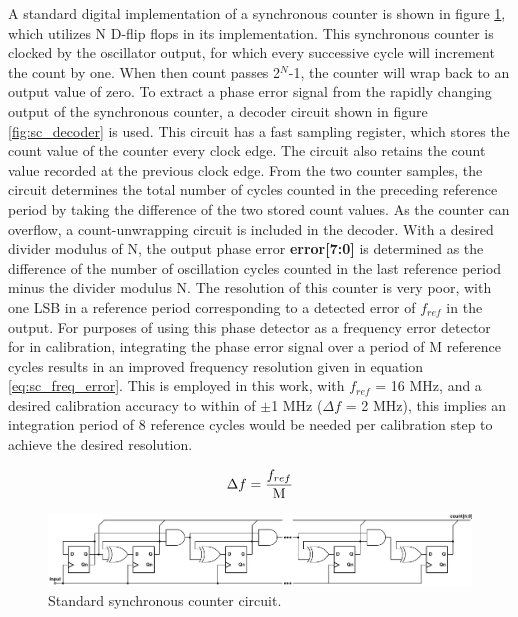 	A standard digital implementation of a synchronous counter is shown in figure \ref{fig:sync_counter}, which utilizes N D-flip flops in its implementation. This synchronous counter is clocked by the oscillator output, for which every successive cycle will increment the count by one. When then count passes 2$^N$-1, the counter will wrap back to an output value of zero. To extract a phase error signal from the rapidly changing output of the synchronous counter, a decoder circuit shown in figure \ref{fig:sc_decoder} is used. This circuit has a fast sampling register, which stores the count value of the counter every clock edge. The circuit also retains the count value recorded at the previous clock edge. From the two counter samples, the circuit determines the total number of cycles counted in the preceding reference period by taking the difference of the two stored count values. As the counter can overflow, a count-unwrapping circuit is included in the decoder. With a desired divider modulus of N, the output phase error \textbf{error[7:0]} is determined as the difference of the number of oscillation cycles counted in the last reference period minus the divider modulus N. The resolution of this counter is very poor, with one LSB in a reference period corresponding to a detected error of $f_{ref}$ in the output. For purposes of using this phase detector as a frequency error detector for in calibration, integrating the phase error signal over a period of M reference cycles results in an improved frequency resolution given in equation \ref{eq:sc_freq_error}. This is employed in this work, with $f_{ref}$ = 16 MHz, and a desired calibration accuracy to within of $\pm$1 MHz ($\Delta f$ = 2 MHz), this implies an integration period of 8 reference cycles would be needed per calibration step to achieve the desired resolution. 

	\begin{equation}\label{eq:sc_freq_error}
	\Delta f = \frac{f_{ref}}{\textnormal{M}}
	\end{equation}
	
			\begin{figure}[htb!]
			        \centering
			        \includegraphics[width=1\textwidth, angle=0]{./figs/sync_counter.pdf}
			    \caption{Standard synchronous counter circuit.}
			    \label{fig:sync_counter}
			\end{figure}

